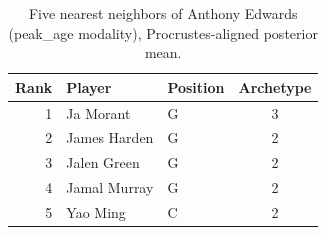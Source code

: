 \begin{table}[htbp]
  \centering\small
  \begin{tabular}{rllc}
    \toprule
    Rank & Player & Position & Archetype \\
    \midrule
    1 & Ja Morant & G & 3 \\
    2 & James Harden & G & 2 \\
    3 & Jalen Green & G & 2 \\
    4 & Jamal Murray & G & 2 \\
    5 & Yao Ming & C & 2 \\
    \bottomrule
  \end{tabular}
  \caption{Five nearest neighbors of Anthony Edwards (peak_age modality), Procrustes-aligned posterior mean.}
  \label{tab:Anthony_Edwards_neighbors_peak_age}
\end{table}

